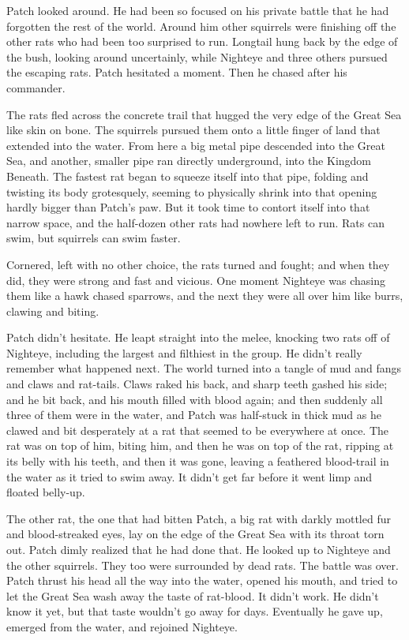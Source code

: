 \documentclass[ebook,oneside,openany,17pt]{memoir}
\newenvironment{tolerant}[1]{%
  \par\tolerance=#1\relax
}{%
  \par
}
\begin{document}
\begin{tolerant}{1000}
Patch looked around. He had been so focused on his private battle that
he had forgotten the rest of the world. Around him other squirrels
were finishing off the other rats who had been too surprised to
run. Longtail hung back by the edge of the bush, looking around
uncertainly, while Nighteye and three others pursued the escaping
rats. Patch hesitated a moment. Then he chased after his commander.
\end{tolerant}

\begin{tolerant}{2000}
The rats fled across the concrete trail that hugged the very edge of
the Great Sea like skin on bone. The squirrels pursued them onto a
little finger of land that extended into the water. From here a big
metal pipe descended into the Great Sea, and another, smaller pipe ran
directly underground, into the Kingdom Beneath. The fastest rat began
to squeeze itself into that pipe, folding and twisting its body
grotesquely, seeming to physically shrink into that opening hardly
bigger than Patch’s paw. But it took time to contort itself into that
narrow space, and the half-dozen other rats had nowhere left to
run. Rats can swim, but squirrels can swim faster.
\end{tolerant}

Cornered, left with no other choice, the rats turn\-ed and fought; and
when they did, they were strong and fast and vicious. One moment
Nighteye was chasing them like a hawk chased sparrows, and the next
they were all over him like burrs, clawing and biting.

Patch didn’t hesitate. He leapt straight into the melee, knocking two
rats off of Nighteye, including the largest and filthiest in the
group. He didn’t really remember what happened next. The world turned
into a tangle of mud and fangs and claws and rat-tails. Claws raked
his back, and sharp teeth gashed his side; and he bit back, and his
mouth filled with blood again; and then suddenly all three of them
were in the water, and Patch was half-stuck in thick mud as he clawed
and bit desperately at a rat that seemed to be everywhere at once. The
rat was on top of him, biting him, and then he was on top of the rat,
ripping at its belly with his teeth, and then it was gone, leaving a
feathered blood-trail in the water as it tried to swim away. It didn’t
get far before it went limp and floated belly-up.

The other rat, the one that had bitten Patch, a big rat with darkly
mottled fur and blood-streaked eyes, lay on the edge of the Great Sea
with its throat torn out. Patch dimly realized that he had done
that. He looked up to Nighteye and the other squirrels. They too were
surrounded by dead rats. The battle was over. Patch thrust his head
all the way into the water, opened his mouth, and tried to let the
Great Sea wash away the taste of rat-blood. It didn’t work. He didn’t
know it yet, but that taste wouldn’t go away for days. Eventually he
gave up, emerged from the water, and rejoined Nighteye.
\end{document}
